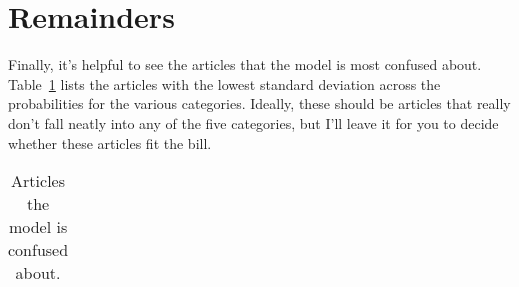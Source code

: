 \documentclass[
  10pt,
  letterpaper,
  DIV=11,
  numbers=noendperiod,
  twoside]{scrartcl}
\begin{document}
\section{Remainders}\label{remainders}

Finally, it's helpful to see the articles that the model is most
confused about. Table~\ref{tbl-confusing} lists the articles with the
lowest standard deviation across the probabilities for the various
categories. Ideally, these should be articles that really don't fall
neatly into any of the five categories, but I'll leave it for you to
decide whether these articles fit the bill.

\begin{longtable}[]{@{}
  >{\raggedright\arraybackslash}p{}
  >{\raggedleft\arraybackslash}p{}
  >{\raggedleft\arraybackslash}p{}
  >{\raggedleft\arraybackslash}p{}
  >{\raggedleft\arraybackslash}p{}
  >{\raggedleft\arraybackslash}p{}@{}}

\caption{\label{tbl-confusing}Articles the model is confused about.}

\tabularnewline


\end{longtable}
\end{document}
